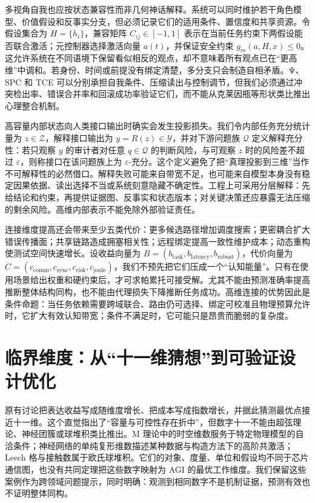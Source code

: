 多视角自我也应按状态兼容性而非几何神话解释。系统可以同时维护若干角色模型、价值假设和反事实分支，但必须记录它们的适用条件、置信度和共享资源。令假设集合为 $H=\{h_i\}$，兼容矩阵 $C_{ij}\in[-1,1]$ 表示在当前任务约束下两假设能否联合激活；元控制器选择激活向量 $a(t)$，并保证安全约束 $g_m(a,H,x)\le0$。这允许系统在不同语境下保留看似相反的观点，却不意味着所有观点已在“更高维”中调和。若身份、时间或前提没有绑定清楚，多分支只会制造自相矛盾。Ψ、SPC 和 TCE 可以分别承担自我条件、压缩读出与控制调节，但我们必须通过冲突检出率、错误合并率和回滚成功率验证它们，而不能从克莱因瓶等形状类比推出心理整合机制。

高容量内部状态向人类接口输出时确实会发生投影损失。我们令内部任务充分统计量为 $z\in\mathcal Z$，解释接口输出为 $y=R(z)\in\mathcal Y$，并对下游问题族 $\mathcal Q$ 定义解释充分性：若只观察 $y$ 的审计者对任意 $q\in\mathcal Q$ 的判断风险，与可观察 $z$ 时的风险差不超过 $\varepsilon$，则称接口在该问题族上为 $\varepsilon$-充分。这个定义避免了把“真理投影到三维”当作不可解释性的必然借口。解释失败可能来自带宽不足，也可能来自模型本身没有稳定因果依据、读出选择不当或系统刻意隐藏不确定性。工程上可采用分层解释：先给结论和约束，再提供证据图、反事实和状态版本；对关键决策还应暴露无法压缩的剩余风险。高维内部表示不能免除外部验证责任。

连接维度提高还会带来至少五类代价：更多候选路径增加调度搜索；更密耦合扩大错误传播面；共享链路造成拥塞相关性；远程绑定提高一致性维护成本；动态重构使测试空间快速增长。设收益向量为 $B=(b_{\mathrm{task}},b_{\mathrm{latency}},b_{\mathrm{robust}})$，代价向量为 $C=(c_{\mathrm{comm}},c_{\mathrm{sync}},c_{\mathrm{risk}},c_{\mathrm{joule}})$，我们不预先把它们压成一个“认知能量”。只有在使用场景给出权重和硬约束后，才可求帕累托可接受解。尤其不能由预测准确率提高推断整体结构同构，也不能由代理损失下降推断任务成功。高维连接的优势因此是条件命题：当任务依赖需要跨域联合、路由仍可选择、绑定可校准且物理预算允许时，它扩大有效认知带宽；条件不满足时，它可能只是昂贵而脆弱的复杂度。

\section{临界维度：从“十一维猜想”到可验证设计优化}
\label{sec:section_1413}

原有讨论把表达收益写成随维度增长、把成本写成指数增长，并据此猜测最优点接近十一维。这个直觉指出了“容量与可控性存在折中”，但数字十一不能由超弦理论、神经团簇或球堆积类比推出。M 理论中的时空维数服务于特定物理模型的自洽条件；神经网络的单纯复形维数描述某种数据与构造方法下的高阶共激活；Leech 格与接触数属于欧氏球堆积。它们的对象、度量、单位和假设均不同于芯片通信图，也没有共同定理把这些数字映射为 AGI 的最优工作维度。我们保留这些案例作为跨领域问题提示，同时明确：观测到相同数字不是机制证据，预测有效也不证明整体同构。

